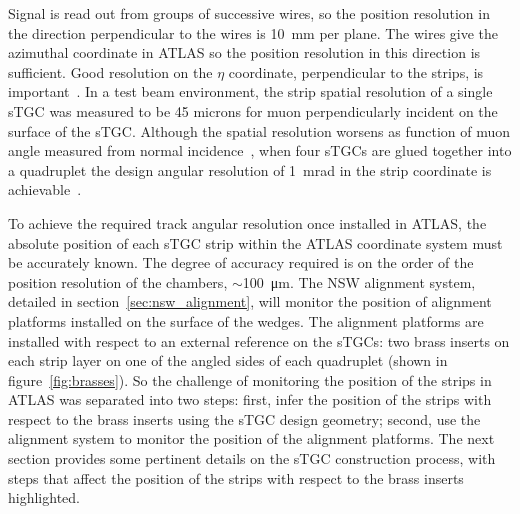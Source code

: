 Signal is read out from groups of successive wires, so the position resolution in the direction perpendicular to the wires is \SI{10}{mm} per plane. The wires give the azimuthal coordinate in ATLAS so the position resolution in this direction is sufficient. Good resolution on the $\eta$ coordinate, perpendicular to the strips, is important~\cite{nsw_tdr}. In a test beam environment, the strip spatial resolution of a single sTGC was measured to be 45 microns for muon perpendicularly incident on the surface of the sTGC.  Although the spatial resolution worsens as function of muon angle measured from normal incidence~\cite{lefebvre_thesis}, when four sTGCs are glued together into a quadruplet the design angular resolution of \SI{1}{mrad} in the strip coordinate is achievable~\cite{nsw_tdr, perez-codina_small-strip_2016}. 

To achieve the required track angular resolution once installed in ATLAS, the absolute position of each sTGC strip within the ATLAS coordinate system must be accurately known. The degree of accuracy required is on the order of the position resolution of the chambers, $\sim$\SI{100}{\micro\meter}. The NSW alignment system, detailed in section~\ref{sec:nsw_alignment}, will monitor the position of alignment platforms installed on the surface of the wedges. The alignment platforms are installed with respect to an external reference on the sTGCs: two brass inserts on each strip layer on one of the angled sides of each quadruplet (shown in figure~\ref{fig:brasses}). So the challenge of monitoring the position of the strips in ATLAS was separated into two steps: first, infer the position of the strips with respect to the brass inserts using the sTGC design geometry; second, use the alignment system to monitor the position of the alignment platforms. The next section provides some pertinent details on the sTGC construction process, with steps that affect the position of the strips with respect to the brass inserts highlighted.


